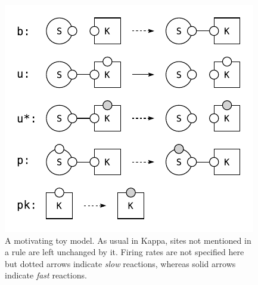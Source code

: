 \begin{figure}[!h]
  \vskip -0.2cm
  \begin{center}
    \includegraphics[scale=0.9]{figures/model.pdf}
  \end{center}
  \vskip -0.2cm
  \caption{A motivating toy model. As usual in Kappa, sites not
    mentioned in a rule are left unchanged by it. Firing rates are
    not specified here but dotted arrows indicate \textit{slow}
    reactions, whereas solid arrows indicate \textit{fast} reactions.}
  \label{fig:model}
\end{figure}
